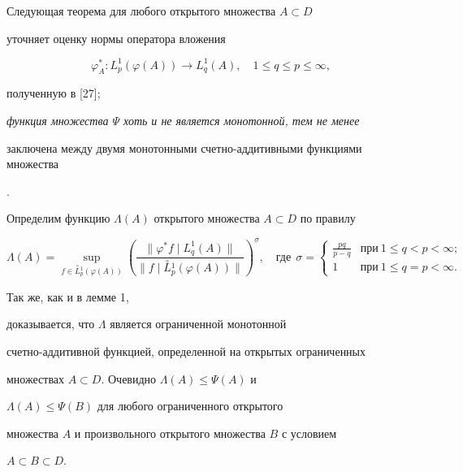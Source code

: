 Следующая теорема для любого открытого множества $A\subset D$ 


уточняет оценку нормы оператора вложения


$$


\varphi^{\ast}_A : L^{1}_p(\varphi(A))\to L^1_q(A),\quad 1\leq q\leq


p\leq\infty,


$$


полученную в [27];


{\it функция множества $\Psi$ хоть и не является монотонной, тем не менее


заключена между двумя монотонными счетно-аддитивными функциями множества}.





Определим функцию $\Lambda(A)$ открытого множества $A\subset


D$ по правилу


$$


\Lambda(A)=\sup_{f\in\overset{\circ}{L}{}_{p}^{1}(\varphi(A))}


\left( \frac{\|\varphi^{\ast} f\mid {L}_{q}^{1}(A)\|}


{\|f\mid \overset{\circ}{L}{}_{p}^{1}(\varphi(A))\|}


\right)^{\sigma},\quad \text{где}\ \ \sigma=


\begin{cases}


\frac{pq}{p-q} & \text{при}\ 1\leq q<p<\infty;\\


1 & \text{при}\ 1\leq q = p<\infty.


\end{cases}


$$


Так же, как и в лемме 1,


доказывается, что $\Lambda$ является ограниченной монотонной


счетно-аддитивной функцией, определенной на открытых ограниченных


множествах $A\subset D$. Очевидно $\Lambda(A)\leq\Psi(A)$ и


$\Lambda(A)\leq\Psi(B)$ для любого ограниченного открытого


множества $A$ и произвольного открытого множества $B$ с условием


$A\subset B\subset D$.





